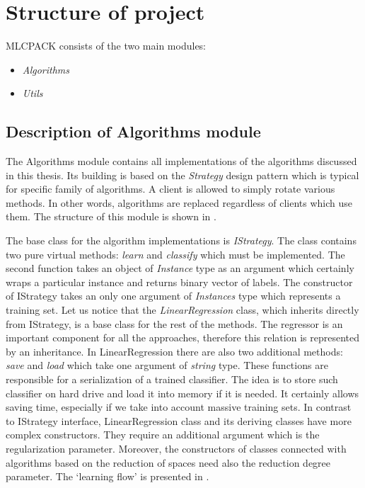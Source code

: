 \documentclass[english,a4paper,twoside]{ppfcmthesis}
\begin{document}
\section{Structure of project}

MLCPACK consists of the two main modules:
\begin{itemize}
    \item \textit{Algorithms}
    \item \textit{Utils}
\end{itemize}

\subsection{Description of Algorithms module}

The Algorithms module contains all implementations of the algorithms discussed in this thesis. Its building is based on the \textit{Strategy} design pattern which is typical for specific family of algorithms. A client is allowed to simply rotate various methods. In other words, algorithms are replaced regardless of clients which use them. The structure of this module is shown in . 

The base class for the algorithm implementations is \textit{IStrategy}. The class contains two pure virtual methods: \textit{learn} and \textit{classify} which must be implemented. The second function takes an object of \textit{Instance} type as an argument which certainly wraps a particular instance and returns binary vector of labels. The constructor of IStrategy takes an only one argument of \textit{Instances} type which represents a training set. Let us notice that the \textit{LinearRegression} class, which inherits directly from IStrategy, is a base class for the rest of the methods. The regressor is an important component for all the approaches, therefore this relation is represented by an inheritance. In LinearRegression there are also two additional methods: \textit{save} and \textit{load} which take one argument of \textit{string} type. These functions are responsible for a serialization of a trained classifier. The idea is to store such classifier on hard drive and load it into memory if it is needed. It certainly allows saving time, especially if we take into account massive training sets. In contrast to IStrategy interface, LinearRegression class and its deriving classes have more complex constructors. They require an additional argument which is the regularization parameter. Moreover, the constructors of classes connected with algorithms based on the reduction of spaces need also the reduction degree parameter. The `learning flow' is presented in .
\end{document}
